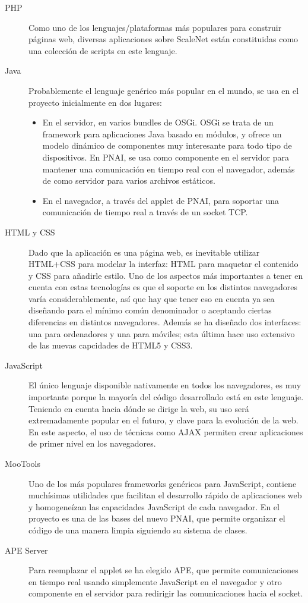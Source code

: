 \begin{description}
  \item[PHP] Como uno de los lenguajes/plataformas más populares para construir páginas web, diversas aplicaciones sobre ScaleNet están constituidas como una colección de scripts en este lenguaje.
  \item[Java] Probablemente el lenguaje genérico más popular en el mundo, se usa en el proyecto inicialmente en dos lugares:
  \begin{itemize}
    \item En el servidor, en varios bundles de OSGi.
    OSGi se trata de un framework para aplicaciones Java basado en módulos, y ofrece un modelo dinámico de componentes muy interesante para todo tipo de dispositivos.
    En PNAI, se usa como componente en el servidor para mantener una comunicación en tiempo real con el navegador, además de como servidor para varios archivos estáticos.
    \item En el navegador, a través del applet de PNAI, para soportar una comunicación de tiempo real a través de un socket TCP.
  \end{itemize}
  \item[HTML y CSS] Dado que la aplicación es una página web, es inevitable utilizar HTML+CSS para modelar la interfaz: HTML para maquetar el contenido y CSS para añadirle estilo.
  Uno de los aspectos más importantes a tener en cuenta con estas tecnologías es que el soporte en los distintos navegadores varía considerablemente, así que hay que tener eso en cuenta ya sea diseñando para el mínimo común denominador o aceptando ciertas diferencias en distintos navegadores.
  Además se ha diseñado dos interfaces: una para ordenadores y una para móviles; esta última hace uso extensivo de las nuevas capcidades de HTML5 y CSS3.
  \item[JavaScript] El único lenguaje disponible nativamente en todos los navegadores, es muy importante porque la mayoría del código desarrollado está en este lenguaje.
  Teniendo en cuenta hacia dónde se dirige la web, su uso será extremadamente popular en el futuro, y clave para la evolución de la web.
  En este aspecto, el uso de técnicas como AJAX permiten crear aplicaciones de primer nivel en los navegadores.
  \item[MooTools] Uno de los más populares frameworks genéricos para JavaScript, contiene muchísimas utilidades que facilitan el desarrollo rápido de aplicaciones web y homogeneízan las capacidades JavaScript de cada navegador.
  En el proyecto es una de las bases del nuevo PNAI, que permite organizar el código de una manera limpia siguiendo su sistema de clases.
  \item[APE Server] Para reemplazar el applet se ha elegido APE, que permite comunicaciones en tiempo real usando simplemente JavaScript en el navegador y otro componente en el servidor para redirigir las comunicaciones hacia el socket.
\end{description}

